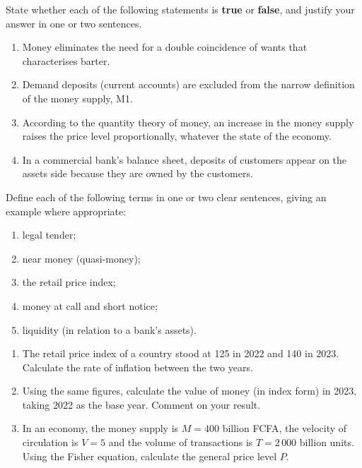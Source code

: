 \documentclass[11pt]{article}
\begin{document}
\begin{exercice}
State whether each of the following statements is \textbf{true} or \textbf{false}, and justify your answer in one or two sentences.
\begin{enumerate}
\item Money eliminates the need for a double coincidence of wants that characterises barter.
\item Demand deposits (current accounts) are excluded from the narrow definition of the money supply, M1.
\item According to the quantity theory of money, an increase in the money supply raises the price level proportionally, whatever the state of the economy.
\item In a commercial bank's balance sheet, deposits of customers appear on the assets side because they are owned by the customers.
\end{enumerate}
\end{exercice}

\begin{exercice}[Definitions]
Define each of the following terms in one or two clear sentences, giving an example where appropriate:
\begin{enumerate}
\item legal tender;
\item near money (quasi-money);
\item the retail price index;
\item money at call and short notice;
\item liquidity (in relation to a bank's assets).
\end{enumerate}
\end{exercice}

\begin{exercice}
\begin{enumerate}
\item The retail price index of a country stood at 125 in 2022 and 140 in 2023. Calculate the rate of inflation between the two years.
\item Using the same figures, calculate the value of money (in index form) in 2023, taking 2022 as the base year. Comment on your result.
\item In an economy, the money supply is $M = 400$ billion FCFA, the velocity of circulation is $V = 5$ and the volume of transactions is $T = 2\,000$ billion units. Using the Fisher equation, calculate the general price level $P$.
\end{enumerate}
\end{exercice}
\end{document}
